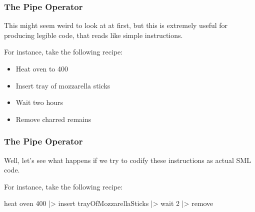 \documentclass[aspectratio=169, handout]{beamer}
\begin{document}
\begin{frame}[fragile]
  \frametitle{The Pipe Operator}

  This might seem weird to look at at first, but this is extremely useful for
  producing legible code, that reads like simple instructions.

  \pause
  \vspace{\fill}

  For instance, take the following recipe:
  \begin{itemize}
    \item Heat oven to 400
    \item Insert tray of mozzarella sticks
    \item Wait two hours
    \item Remove charred remains
  \end{itemize}
\end{frame}

\begin{frame}[fragile]
  \frametitle{The Pipe Operator}

  Well, let's see what happens if we try to codify these instructions as
  actual SML code.

  \pause
  \vspace{\fill}

  For instance, take the following recipe:
  \begin{codeblock}
    heat oven 400
    |> insert trayOfMozzarellaSticks
    |> wait 2
    |> remove
  \end{codeblock}
\end{frame}
\end{document}
